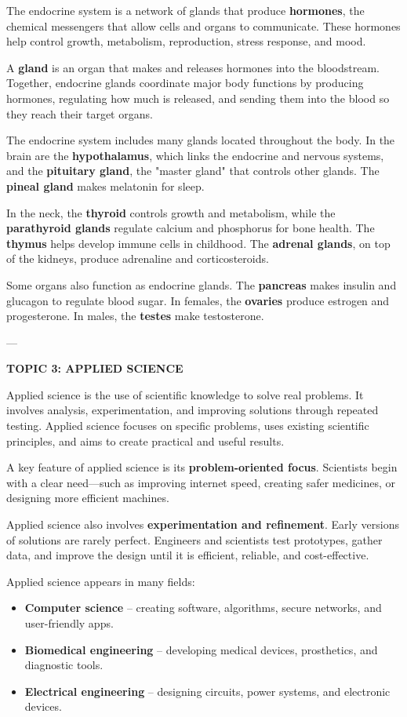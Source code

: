 {{The endocrine system is a network of glands that produce \textbf{hormones}, the chemical messengers that allow cells and organs to communicate. These hormones help control growth, metabolism, reproduction, stress response, and mood.

A \textbf{gland} is an organ that makes and releases hormones into the bloodstream. Together, endocrine glands coordinate major body functions by producing hormones, regulating how much is released, and sending them into the blood so they reach their target organs.

The endocrine system includes many glands located throughout the body. In the brain are the \textbf{hypothalamus}, which links the endocrine and nervous systems, and the \textbf{pituitary gland}, the "master gland" that controls other glands. The \textbf{pineal gland} makes melatonin for sleep.

In the neck, the \textbf{thyroid} controls growth and metabolism, while the \textbf{parathyroid glands} regulate calcium and phosphorus for bone health. The \textbf{thymus} helps develop immune cells in childhood. The \textbf{adrenal glands}, on top of the kidneys, produce adrenaline and corticosteroids.

Some organs also function as endocrine glands. The \textbf{pancreas} makes insulin and glucagon to regulate blood sugar. In females, the \textbf{ovaries} produce estrogen and progesterone. In males, the \textbf{testes} make testosterone.

---

\textbf{TOPIC 3: APPLIED SCIENCE}

Applied science is the use of scientific knowledge to solve real problems. It involves analysis, experimentation, and improving solutions through repeated testing. Applied science focuses on specific problems, uses existing scientific principles, and aims to create practical and useful results.

A key feature of applied science is its \textbf{problem-oriented focus}. Scientists begin with a clear need—such as improving internet speed, creating safer medicines, or designing more efficient machines.

Applied science also involves \textbf{experimentation and refinement}. Early versions of solutions are rarely perfect. Engineers and scientists test prototypes, gather data, and improve the design until it is efficient, reliable, and cost-effective.

Applied science appears in many fields:
\begin{itemize}
    \item \textbf{Computer science} – creating software, algorithms, secure networks, and user-friendly apps.
    \item \textbf{Biomedical engineering} – developing medical devices, prosthetics, and diagnostic tools.
    \item \textbf{Electrical engineering} – designing circuits, power systems, and electronic devices.
\end{itemize}

}}
